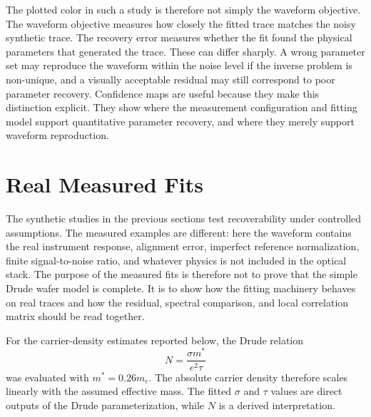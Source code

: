\documentclass[11pt]{article}
\begin{document}
The plotted color in such a study is therefore not simply the waveform objective. The waveform objective measures how closely the fitted trace matches the noisy synthetic trace. The recovery error measures whether the fit found the physical parameters that generated the trace. These can differ sharply. A wrong parameter set may reproduce the waveform within the noise level if the inverse problem is non-unique, and a visually acceptable residual may still correspond to poor parameter recovery. Confidence maps are useful because they make this distinction explicit. They show where the measurement configuration and fitting model support quantitative parameter recovery, and where they merely support waveform reproduction.


\section{Real Measured Fits}

The synthetic studies in the previous sections test recoverability under controlled assumptions. The measured examples are different: here the waveform contains the real instrument response, alignment error, imperfect reference normalization, finite signal-to-noise ratio, and whatever physics is not included in the optical stack. The purpose of the measured fits is therefore not to prove that the simple Drude wafer model is complete. It is to show how the fitting machinery behaves on real traces and how the residual, spectral comparison, and local correlation matrix should be read together.

For the carrier-density estimates reported below, the Drude relation
\[
  N=\frac{\sigma m^\ast}{e^2\tau}
\]
was evaluated with \(m^\ast=0.26m_e\). The absolute carrier density therefore scales linearly with the assumed effective mass. The fitted \(\sigma\) and \(\tau\) values are direct outputs of the Drude parameterization, while \(N\) is a derived interpretation.
\end{document}

